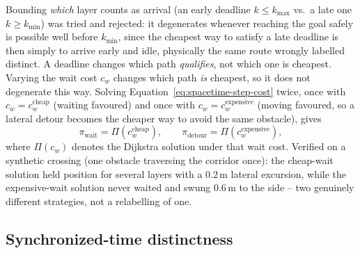 \documentclass[11pt,a4paper]{article}
\begin{document}
Bounding \emph{which} layer counts as arrival (an early deadline
$k\le k_{\max}$ vs.\ a late one $k\ge k_{\min}$) was tried and rejected: it
degenerates whenever reaching the goal safely is possible well before
$k_{\min}$, since the cheapest way to satisfy a late deadline is then simply
to arrive early and idle, physically the same route wrongly labelled
distinct. A deadline changes which path \emph{qualifies}, not which one is
cheapest. Varying the wait cost $c_w$ changes which path \emph{is} cheapest,
so it does not degenerate this way. Solving Equation~\eqref{eq:spacetime-step-cost} twice,
once with $c_w=c_w^{\text{cheap}}$ (waiting favoured) and once with
$c_w=c_w^{\text{expensive}}$ (moving favoured, so a lateral detour becomes
the cheaper way to avoid the same obstacle), gives
\begin{equation}
  \pi_{\mathrm{wait}}=\Pi(c_w^{\text{cheap}}),\qquad
  \pi_{\mathrm{detour}}=\Pi(c_w^{\text{expensive}}),
  \label{eq:two-route}
\end{equation}
where $\Pi(c_w)$ denotes the Dijkstra solution under that wait cost. Verified
on a synthetic crossing (one obstacle traversing the corridor once): the
cheap-wait solution held position for several layers with a $0.2\,$m lateral
excursion, while the expensive-wait solution never waited and swung $0.6\,$m
to the side -- two genuinely different strategies, not a relabelling of one.

\subsection{Synchronized-time distinctness}
\end{document}
